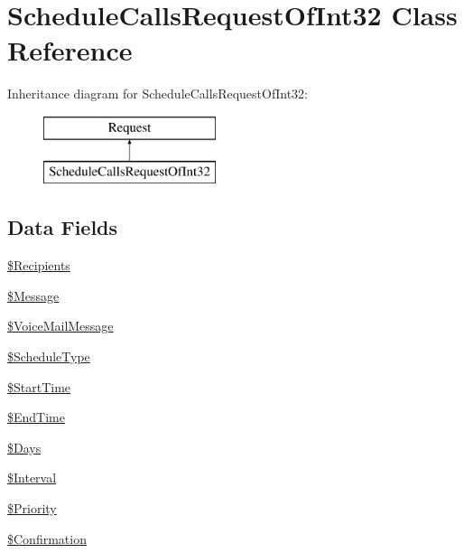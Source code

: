\hypertarget{class_schedule_calls_request_of_int32}{\section{Schedule\-Calls\-Request\-Of\-Int32 Class Reference}
\label{class_schedule_calls_request_of_int32}
}
Inheritance diagram for Schedule\-Calls\-Request\-Of\-Int32\-:\begin{figure}[H]
\begin{center}
\leavevmode
\includegraphics[height=2.000000cm]{class_schedule_calls_request_of_int32}
\end{center}
\end{figure}
\subsection*{Data Fields}
\begin{DoxyCompactItemize}
\item 
\hyperlink{class_schedule_calls_request_of_int32_a33ad804cbe51afe501872f4363f0c068}{\$\-Recipients}
\item 
\hyperlink{class_schedule_calls_request_of_int32_ab23576849f64a6b190167099cfab7eae}{\$\-Message}
\item 
\hyperlink{class_schedule_calls_request_of_int32_ab8946a1492b48b7d64a4e6f298903f74}{\$\-Voice\-Mail\-Message}
\item 
\hyperlink{class_schedule_calls_request_of_int32_ad8484f456a9bd6b83b5f077db37b7558}{\$\-Schedule\-Type}
\item 
\hyperlink{class_schedule_calls_request_of_int32_a2f8fa05008bd8e80ae9cb79699e0ed2c}{\$\-Start\-Time}
\item 
\hyperlink{class_schedule_calls_request_of_int32_ab7205c64d4caf57ad5c439d161116d8e}{\$\-End\-Time}
\item 
\hyperlink{class_schedule_calls_request_of_int32_a541b96a58d5cadab10a165a562fc066e}{\$\-Days}
\item 
\hyperlink{class_schedule_calls_request_of_int32_a06a0c2a526e2a41abe73b0ffdf2932ee}{\$\-Interval}
\item 
\hyperlink{class_schedule_calls_request_of_int32_a7c6546640ba3eafd143d8f0e6805de27}{\$\-Priority}
\item 
\hyperlink{class_schedule_calls_request_of_int32_afcd9214c7e03e9e066611fb7ee041fb9}{\$\-Confirmation}
\end{DoxyCompactItemize}


